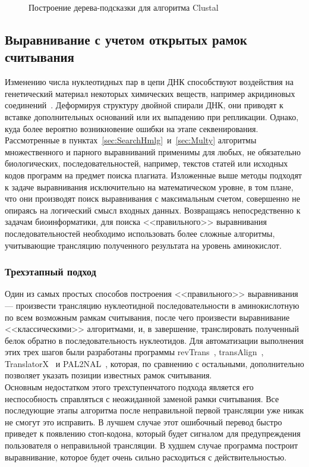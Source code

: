\begin{figure}[h]
	\caption{Построение дерева-подсказки для алгоритма Clustal}
	\label{ris:Clustal}
\end{figure}

\subsection[Выравнивание с учетом открытых рамок считывания]{\large Выравнивание с учетом открытых рамок считывания}
\hspace{\parindent} Изменению числа нуклеотидных пар в цепи ДНК способствуют воздействия на генетический материал некоторых химических веществ, например акридиновых соединений~\cite{BioBook}. Деформируя структуру двойной спирали ДНК, они приводят к вставке дополнительных оснований или их выпадению при репликации. Однако, куда более вероятно возникновение ошибки на этапе секвенирования.\\
\indent Рассмотренные в пунктах~\ref{sec:SearchHmlg}~и~\ref{sec:Multy} алгоритмы множественного и парного выравниваний применимы для любых, не обязательно биологических, последовательностей, например, текстов статей или исходных кодов программ на предмет поиска плагиата. Изложенные выше методы подходят к задаче выравнивания исключительно на математическом уровне, в том плане, что они производят поиск выравнивания с максимальным счетом, совершенно не опираясь на логический смысл входных данных. Возвращаясь непосредственно к задачам биоинформатики, для поиска <<правильного>> выравнивания последовательностей необходимо использовать более сложные алгоритмы, учитывающие трансляцию полученного результата на уровень аминокислот.

\subsubsection[Трехэтапный подход]{\large Трехэтапный подход}
\hspace{\parindent} Один из самых простых способов построения <<правильного>> выравнивания --- произвести трансляцию нуклеотидной последовательности в аминокислотную по всем возможным рамкам считывания, после чего произвести выравнивание <<классическими>> алгоритмами, и, в завершение, транслировать полученный белок обратно в последовательность нуклеотидов. Для автоматизации выполнения этих трех шагов были разработаны программы revTrans~\cite{RevTrans}, transAlign~\cite{transAlign}, TranslatorX~\cite{TranslatorX} и PAL2NAL~\cite{PAL2NAL}, которая, по сравнению с остальными, дополнительно позволяет указать позиции известных рамок считывания. \\
\indent Основным недостатком этого трехступенчатого подхода является его неспособность справляться с неожиданной заменой рамки считывания. Все последующие этапы алгоритма после неправильной первой трансляции уже никак не смогут это исправить. В лучшем случае этот ошибочный перевод быстро приведет к появлению стоп-кодона, который будет сигналом для предупреждения пользователя о неправильной трансляции. В худшем случае программа построит выравнивание, которое будет очень сильно расходиться с действительностью.

